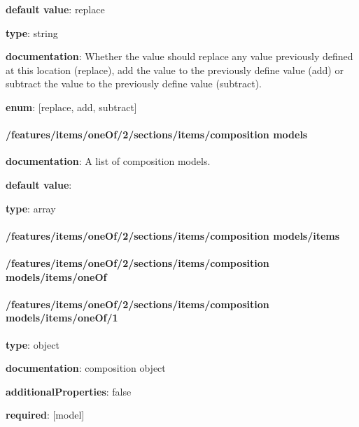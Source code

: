\begin{itemized}
\item {\bf default value}: replace
\item {\bf type}: string
\item {\bf documentation}: Whether the value should replace any value previously defined at this location (replace), add the value to the previously define value (add) or subtract the value to the previously define value (subtract).
\item {\bf enum}: [replace, add, subtract]\end{itemized}\paragraph{/features/items/oneOf/2/sections/items/composition models} \begin{itemized}
\item {\bf documentation}: A list of composition models.
\item {\bf default value}: 
\item {\bf type}: array
\paragraph{/features/items/oneOf/2/sections/items/composition models/items} \begin{itemized}
\end{itemized}\end{itemized}\paragraph{/features/items/oneOf/2/sections/items/composition models/items/oneOf} \begin{itemized}
\end{itemized}\paragraph{/features/items/oneOf/2/sections/items/composition models/items/oneOf/1} \begin{itemized}
\item {\bf type}: object
\item {\bf documentation}: composition object
\item {\bf additionalProperties}: false
\item {\bf required}: [model]\end{itemized}
